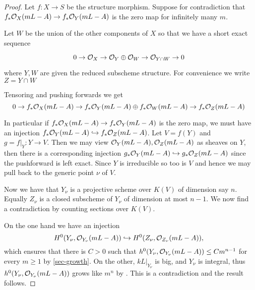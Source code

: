 \begin{proof}
	
	Let $f:X \to S$ be the structure morphism. Suppose for contradiction that $f_{*}\ox(mL-A) \to f_{*}\ox[Y](mL-A)$ is the zero map for infinitely many $m$.
	
	Let $W$ be the union of the other components of $X$ so that we have a short exact sequence 
	
	\[0 \to \ox \to \ox[Y]\oplus \ox[W] \to \ox[Y\cap W] \to 0\]
	
	where $Y,W$ are given the reduced subscheme structure. For convenience we write $Z=Y\cap W$
	
	Tensoring and pushing forwards we get 
	\[0 \to f_{*}\ox(mL-A)\to f_{*}\ox[Y](mL-A)\oplus f_{*}\ox[W](mL-A) \to f_{*}\ox[Z](mL-A) \]
	
	In particular if $f_{*}\ox(mL-A) \to f_{*}\ox[Y](mL-A)$ is the zero map, we must have an injection $ f_{*}\ox[Y](mL-A) \hookrightarrow f_{*}\ox[Z](mL-A)$. Let $V=f(Y)$ and $g=f|_{Y}:Y \to V$. Then we may view $\ox[Y](mL-A), \ox[Z](mL-A)$ as sheaves on $Y$, then there is a corresponding injection $g_{*}\ox[Y](mL-A) \hookrightarrow g_{*}\ox[Z](mL-A)$ since the pushforward is left exact. Since $Y$ is irreducible so too is $V$ and hence we may pull back to the generic point $\nu$ of $V$.
	
	Now we have that $Y_{\nu}$ is a projective scheme over $K(V)$ of dimension say $n$. Equally $Z_{\nu}$ is a closed subscheme of $Y_{\nu}$ of dimension at most $n-1$. We now find a contradiction by counting sections over $K(V)$.
	
	On the one hand we have an injection $$H^{0}(Y_{\nu},\ox[Y_{\nu}](mL-A)) \hookrightarrow H^{0}(Z_{\nu}, \ox[Z_{\nu}](mL-A)),$$ which ensures that there is $C > 0$ such that $h^{0}(Y_{\nu}, \ox[Y_{\nu}](mL-A)) \leq C m^{n-1}$ for every $m \geq 1$ by \autoref{sec-growth}. On the other, $kL|_{Y_{\nu}}$ is big, and $Y_{\nu}$ is integral, thus $h^{0}(Y_{\nu}, \ox[Y_{\nu}](mL-A))$ grows like $m^{n}$ by \cite[Lemma 4.2]{birkar2017augmented}. This is a contradiction and the result follows.		
\end{proof}


